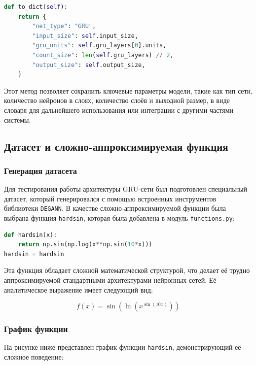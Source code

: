 \begin{lstlisting}[language=Python, caption=Экспорт модели в словарь]
def to_dict(self):
    return {
        "net_type": "GRU",
        "input_size": self.input_size,
        "gru_units": self.gru_layers[0].units,
        "count_size": len(self.gru_layers) // 2,
        "output_size": self.output_size,
    }
\end{lstlisting}

Этот метод позволяет сохранить ключевые параметры модели, такие как тип сети, количество нейронов в слоях, количество слоёв и выходной размер, в виде словаря для дальнейшего использования или интеграции с другими частями системы.



\subsection{Датасет и сложно-аппроксимируемая функция}
\label{subsec:task2}

\subsubsection{Генерация датасета}
Для тестирования работы архитектуры GRU-сети был подготовлен специальный датасет, который генерировался с помощью встроенных инструментов библиотеки \texttt{DEGANN}. В качестве сложно-аппроксимируемой функции была выбрана функция \texttt{hardsin}, которая была добавлена в модуль \texttt{functions.py}:

\begin{lstlisting}[language=Python, breaklines, caption=Реализация функции \texttt{hardsin} в \texttt{functions.py}]
def hardsin(x):
    return np.sin(np.log(x**np.sin(10*x)))
hardsin = hardsin
\end{lstlisting}

Эта функция обладает сложной математической структурой, что делает её трудно аппроксимируемой стандартными архитектурами нейронных сетей. Её аналитическое выражение имеет следующий вид:

\[
f(x) = \sin\left(\ln(x^{\sin(10x)})\right)
\]

\subsubsection{График функции}
На рисунке ниже представлен график функции \texttt{hardsin}, демонстрирующий её сложное поведение:

